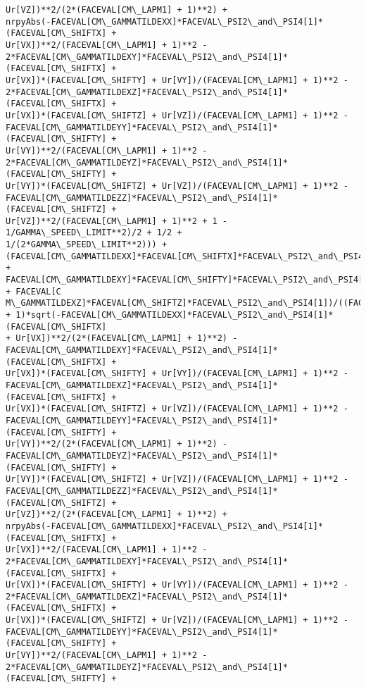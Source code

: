 \documentclass[landscape,letterpaper,10pt,english]{article}
\begin{document}
\begin{Verbatim}[commandchars=\\\{\}]
Ur[VZ])**2/(2*(FACEVAL[CM\_LAPM1] + 1)**2) +
nrpyAbs(-FACEVAL[CM\_GAMMATILDEXX]*FACEVAL\_PSI2\_and\_PSI4[1]*(FACEVAL[CM\_SHIFTX] +
Ur[VX])**2/(FACEVAL[CM\_LAPM1] + 1)**2 -
2*FACEVAL[CM\_GAMMATILDEXY]*FACEVAL\_PSI2\_and\_PSI4[1]*(FACEVAL[CM\_SHIFTX] +
Ur[VX])*(FACEVAL[CM\_SHIFTY] + Ur[VY])/(FACEVAL[CM\_LAPM1] + 1)**2 -
2*FACEVAL[CM\_GAMMATILDEXZ]*FACEVAL\_PSI2\_and\_PSI4[1]*(FACEVAL[CM\_SHIFTX] +
Ur[VX])*(FACEVAL[CM\_SHIFTZ] + Ur[VZ])/(FACEVAL[CM\_LAPM1] + 1)**2 -
FACEVAL[CM\_GAMMATILDEYY]*FACEVAL\_PSI2\_and\_PSI4[1]*(FACEVAL[CM\_SHIFTY] +
Ur[VY])**2/(FACEVAL[CM\_LAPM1] + 1)**2 -
2*FACEVAL[CM\_GAMMATILDEYZ]*FACEVAL\_PSI2\_and\_PSI4[1]*(FACEVAL[CM\_SHIFTY] +
Ur[VY])*(FACEVAL[CM\_SHIFTZ] + Ur[VZ])/(FACEVAL[CM\_LAPM1] + 1)**2 -
FACEVAL[CM\_GAMMATILDEZZ]*FACEVAL\_PSI2\_and\_PSI4[1]*(FACEVAL[CM\_SHIFTZ] +
Ur[VZ])**2/(FACEVAL[CM\_LAPM1] + 1)**2 + 1 - 1/GAMMA\_SPEED\_LIMIT**2)/2 + 1/2 +
1/(2*GAMMA\_SPEED\_LIMIT**2))) +
(FACEVAL[CM\_GAMMATILDEXX]*FACEVAL[CM\_SHIFTX]*FACEVAL\_PSI2\_and\_PSI4[1] +
FACEVAL[CM\_GAMMATILDEXY]*FACEVAL[CM\_SHIFTY]*FACEVAL\_PSI2\_and\_PSI4[1] + FACEVAL[C
M\_GAMMATILDEXZ]*FACEVAL[CM\_SHIFTZ]*FACEVAL\_PSI2\_and\_PSI4[1])/((FACEVAL[CM\_LAPM1]
+ 1)*sqrt(-FACEVAL[CM\_GAMMATILDEXX]*FACEVAL\_PSI2\_and\_PSI4[1]*(FACEVAL[CM\_SHIFTX]
+ Ur[VX])**2/(2*(FACEVAL[CM\_LAPM1] + 1)**2) -
FACEVAL[CM\_GAMMATILDEXY]*FACEVAL\_PSI2\_and\_PSI4[1]*(FACEVAL[CM\_SHIFTX] +
Ur[VX])*(FACEVAL[CM\_SHIFTY] + Ur[VY])/(FACEVAL[CM\_LAPM1] + 1)**2 -
FACEVAL[CM\_GAMMATILDEXZ]*FACEVAL\_PSI2\_and\_PSI4[1]*(FACEVAL[CM\_SHIFTX] +
Ur[VX])*(FACEVAL[CM\_SHIFTZ] + Ur[VZ])/(FACEVAL[CM\_LAPM1] + 1)**2 -
FACEVAL[CM\_GAMMATILDEYY]*FACEVAL\_PSI2\_and\_PSI4[1]*(FACEVAL[CM\_SHIFTY] +
Ur[VY])**2/(2*(FACEVAL[CM\_LAPM1] + 1)**2) -
FACEVAL[CM\_GAMMATILDEYZ]*FACEVAL\_PSI2\_and\_PSI4[1]*(FACEVAL[CM\_SHIFTY] +
Ur[VY])*(FACEVAL[CM\_SHIFTZ] + Ur[VZ])/(FACEVAL[CM\_LAPM1] + 1)**2 -
FACEVAL[CM\_GAMMATILDEZZ]*FACEVAL\_PSI2\_and\_PSI4[1]*(FACEVAL[CM\_SHIFTZ] +
Ur[VZ])**2/(2*(FACEVAL[CM\_LAPM1] + 1)**2) +
nrpyAbs(-FACEVAL[CM\_GAMMATILDEXX]*FACEVAL\_PSI2\_and\_PSI4[1]*(FACEVAL[CM\_SHIFTX] +
Ur[VX])**2/(FACEVAL[CM\_LAPM1] + 1)**2 -
2*FACEVAL[CM\_GAMMATILDEXY]*FACEVAL\_PSI2\_and\_PSI4[1]*(FACEVAL[CM\_SHIFTX] +
Ur[VX])*(FACEVAL[CM\_SHIFTY] + Ur[VY])/(FACEVAL[CM\_LAPM1] + 1)**2 -
2*FACEVAL[CM\_GAMMATILDEXZ]*FACEVAL\_PSI2\_and\_PSI4[1]*(FACEVAL[CM\_SHIFTX] +
Ur[VX])*(FACEVAL[CM\_SHIFTZ] + Ur[VZ])/(FACEVAL[CM\_LAPM1] + 1)**2 -
FACEVAL[CM\_GAMMATILDEYY]*FACEVAL\_PSI2\_and\_PSI4[1]*(FACEVAL[CM\_SHIFTY] +
Ur[VY])**2/(FACEVAL[CM\_LAPM1] + 1)**2 -
2*FACEVAL[CM\_GAMMATILDEYZ]*FACEVAL\_PSI2\_and\_PSI4[1]*(FACEVAL[CM\_SHIFTY] +

\end{Verbatim}
\end{document}
